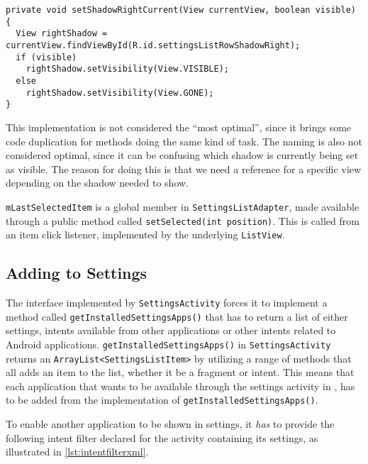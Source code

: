 \begin{lstlisting}[caption={One of three methods setting the visibility of shadows related to the selected list item.}, label={lst:settingslistadapter:shadow}]
private void setShadowRightCurrent(View currentView, boolean visible) {
  View rightShadow = currentView.findViewById(R.id.settingsListRowShadowRight);
  if (visible)
    rightShadow.setVisibility(View.VISIBLE);
  else
    rightShadow.setVisibility(View.GONE);
}
\end{lstlisting}

This implementation is not considered the ``most optimal'', since it brings some code duplication for methods doing the same kind of task.
The naming is also not considered optimal, since it can be confusing which shadow is currently being set as visible.
The reason for doing this is that we need a reference for a specific view depending on the shadow needed to show.

\lstinline|mLastSelectedItem| is a global member in \lstinline|SettingsListAdapter|, made available through a public method called \lstinline|setSelected(int position)|.
This is called from an item click listener, implemented by the underlying \lstinline|ListView|.


\subsection{Adding to Settings}
The interface implemented by \lstinline|SettingsActivity| forces it to implement a method called \lstinline|getInstalledSettingsApps()| that has to return a list of either \launcher settings, intents available from other \giraf applications or other intents related to Android applications.
\lstinline|getInstalledSettingsApps()| in \lstinline|SettingsActivity| returns an \lstinline|ArrayList<SettingsListItem>| by utilizing a range of methods that all adds an item to the list, whether it be a fragment or intent.
This means that each \giraf application that wants to be available through the settings activity in \launcher, has to be added from the implementation of \lstinline|getInstalledSettingsApps()|.

To enable another \giraf application to be shown in settings, it \textit{has} to provide the following intent filter declared for the activity containing its settings, as illustrated in \cref{lst:intentfilterxml}.

